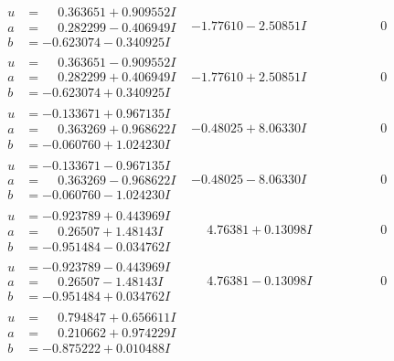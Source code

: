 \documentclass[1p]{elsarticle_modified}
\theoremstyle{definition}
\begin{document}
$$\begin{array}{c|c|c}
\begin{aligned}
u &= \phantom{-}0.363651 + 0.909552 I \\
a &= \phantom{-}0.282299 - 0.406949 I \\
b &= -0.623074 - 0.340925 I\end{aligned}
 & -1.77610 - 2.50851 I & \phantom{-0.000000 } 0 \\ \hline\begin{aligned}
u &= \phantom{-}0.363651 - 0.909552 I \\
a &= \phantom{-}0.282299 + 0.406949 I \\
b &= -0.623074 + 0.340925 I\end{aligned}
 & -1.77610 + 2.50851 I & \phantom{-0.000000 } 0 \\ \hline\begin{aligned}
u &= -0.133671 + 0.967135 I \\
a &= \phantom{-}0.363269 + 0.968622 I \\
b &= -0.060760 + 1.024230 I\end{aligned}
 & -0.48025 + 8.06330 I & \phantom{-0.000000 } 0 \\ \hline\begin{aligned}
u &= -0.133671 - 0.967135 I \\
a &= \phantom{-}0.363269 - 0.968622 I \\
b &= -0.060760 - 1.024230 I\end{aligned}
 & -0.48025 - 8.06330 I & \phantom{-0.000000 } 0 \\ \hline\begin{aligned}
u &= -0.923789 + 0.443969 I \\
a &= \phantom{-}0.26507 + 1.48143 I \\
b &= -0.951484 - 0.034762 I\end{aligned}
 & \phantom{-}4.76381 + 0.13098 I & \phantom{-0.000000 } 0 \\ \hline\begin{aligned}
u &= -0.923789 - 0.443969 I \\
a &= \phantom{-}0.26507 - 1.48143 I \\
b &= -0.951484 + 0.034762 I\end{aligned}
 & \phantom{-}4.76381 - 0.13098 I & \phantom{-0.000000 } 0 \\ \hline\begin{aligned}
u &= \phantom{-}0.794847 + 0.656611 I \\
a &= \phantom{-}0.210662 + 0.974229 I \\
b &= -0.875222 + 0.010488 I\end{aligned}

\end{array}$$
\end{document}
